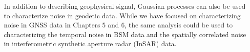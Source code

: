 In addition to describing geophysical signal, Gaussian processes can also be used to characterize noise in geodetic data. While we have focused on characterizing noise in GNSS data in Chapters 5 and 6, the same analysis could be used to characterizing the temporal noise in BSM data and the spatially correlated noise in interferometric synthetic aperture radar (InSAR) data.         



  


